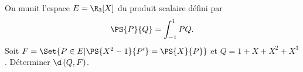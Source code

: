 \begin{enonce}
\begin{exercise}[ID={RMS127 E692},subtitle={Mines-Ponts PSI 2016},tags={}, difficulty={0}]
  On munit l'espace $E=\R_3[X]$ du produit scalaire défini par
  \begin{equation*}
    \PS{P}{Q} = \int_{-1}^{1} PQ.
  \end{equation*}
  Soit $F=\Set{P\in E | \PS{X^2-1}{P'} = \PS{X}{P}}$ et $Q=1+X+X^2+X^3$.
  Déterminer $\d\left( Q,F \right)$.
\end{exercise}
\begin{solution}
\end{solution}
\end{enonce}
